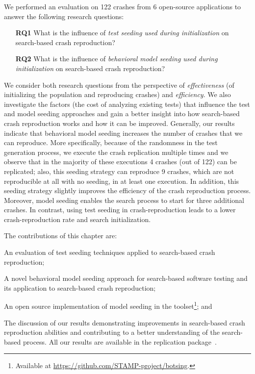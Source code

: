 We performed an evaluation on 122 crashes from 6 open-source applications to answer the following research questions: 
%
\begin{itemize}
\item[\textbf{RQ1}] What is the influence of \emph{test seeding used during initialization} on search-based crash reproduction?
\item[\textbf{RQ2}]  What is the influence of \emph{behavioral model seeding used during initialization}  on search-based crash reproduction?
\end{itemize}
%
We consider both research questions from the perspective of \emph{effectiveness} (of initializing the population and reproducing crashes) and \emph{efficiency}. We also investigate the factors (\eg the cost of analyzing existing tests) that influence the test and model seeding approaches and gain a better insight into how search-based crash reproduction works and how it can be improved.
Generally, our results indicate that behavioral model seeding increases the number of crashes that we can reproduce. 
More specifically, because of the randomness in the test generation process, we execute the crash replication multiple times and we observe that in the majority of these executions 4 crashes (out of 122) can be replicated; also, this seeding strategy can reproduce 9 crashes, which are not reproducible at all with no seeding, in at least one execution. In addition, this seeding strategy slightly improves the efficiency of the crash reproduction process. Moreover, model seeding enables the search process to start for three additional crashes. In contrast, using test seeding in crash-reproduction leads to a lower crash-reproduction rate and search initialization.

The contributions of this chapter are:
\begin{compactenum}
    \item An evaluation of test seeding techniques applied to search-based crash reproduction;
    \item A novel behavioral model seeding approach for search-based software testing and its application to search-based crash reproduction;
    \item An open source implementation of model seeding in the \botsing toolset\footnote{Available at \url{https://github.com/STAMP-project/botsing}.}; and
    \item The discussion of our results demonstrating improvements in search-based crash reproduction abilities and contributing to a better understanding of the search-based process. All our results are available in the replication package~\cite{pouria_derakhshanfar_2019_3673916}.
\end{compactenum}

